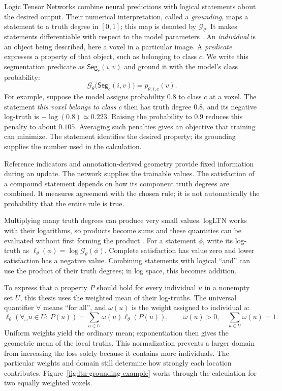 \documentclass[12pt,a4paper]{article}
\begin{document}
Logic Tensor Networks combine neural predictions with logical statements
about the desired output. Their numerical interpretation, called a
\emph{grounding}, maps a statement to a truth degree in $[0,1]$; this map
is denoted by $\mathcal G_\theta$. It makes statements differentiable
with respect to the model parameters
\cite{badreddine2022logic}. An \emph{individual} is an object being described,
here a voxel in a particular image. A \emph{predicate} expresses a property
of that object, such as belonging to class $c$. We write this segmentation
predicate as $\mathsf{Seg}_c(i,v)$ and ground it with the model's class
probability:
\begin{equation}
\mathcal{G}_{\theta}\bigl(\mathsf{Seg}_c(i,v)\bigr)
=p_{\theta,i,c}(v).
\label{eq:segmentation-predicate}
\end{equation}
For example, suppose the model assigns probability $0.8$ to class $c$
at a voxel. The statement \emph{this voxel belongs to class $c$} then
has truth degree $0.8$, and its negative log-truth is
$-\log(0.8)\simeq0.223$. Raising the probability to $0.9$ reduces this
penalty to about $0.105$. Averaging such penalties gives an objective
that training can minimize. The statement identifies the desired
property; its grounding supplies the number used in the calculation.

Reference indicators and annotation-derived geometry provide fixed
information during an update. The network supplies the trainable values.
The satisfaction of a compound statement depends on how its component
truth degrees are combined. It measures agreement with the chosen rule;
it is not automatically the probability that the entire rule is true.

Multiplying many truth degrees can produce very small values. logLTN works
with their logarithms, so products become sums and these quantities can be
evaluated without first forming the product \cite{badreddine2023logltn}. For
a statement $\phi$, write its log-truth as $\ell_\theta(\phi)=\log\mathcal
G_\theta(\phi)$. Complete satisfaction has value zero and lower satisfaction
has a negative value. Combining statements with logical ``and'' can use the
product of their truth degrees; in log space, this becomes addition.

To express that a property $P$ should hold for every individual $u$ in a
nonempty set $U$, this thesis uses the weighted mean of their log-truths.
The universal quantifier $\forall$ means ``for all'', and $\omega(u)$
is the weight assigned to individual $u$:
\begin{equation}
\ell_{\theta}(\forall_{\omega}u\in U:\,P(u))
=\sum_{u\in U}\omega(u)\ell_{\theta}(P(u)),
\qquad
\omega(u)>0,\quad\sum_{u\in U}\omega(u)=1.
\label{eq:weighted-log-universal}
\end{equation}
Uniform weights yield the ordinary mean; exponentiation then gives the
geometric mean of the local truths. This normalization prevents a larger
domain from increasing the loss solely because it contains more
individuals. The particular weights and domain still determine how
strongly each location contributes.
Figure~\ref{fig:ltn-grounding-example} works through the calculation
for two equally weighted voxels.
\end{document}

